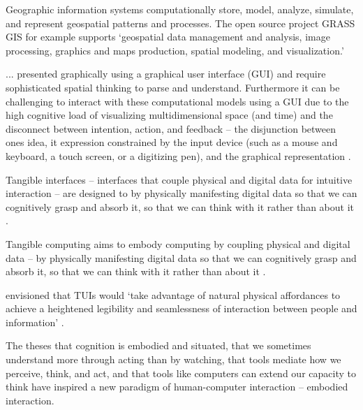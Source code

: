Geographic information systems computationally store, model, analyze, simulate, and represent geospatial patterns and processes. 
%
The open source project GRASS GIS for example supports 
`geospatial data management and analysis, image processing, graphics and maps production, spatial modeling, and visualization.'


... presented graphically using a graphical user interface (GUI) and require sophisticated spatial thinking to parse and understand. 
Furthermore it can be challenging to interact with these computational models using a GUI 
due to the high cognitive load of visualizing multidimensional space (and time) %
and the disconnect between intention, action, and feedback -- 
the disjunction between ones idea, it expression constrained by the input device (such as a mouse and keyboard, a touch screen, or a digitizing pen), and the graphical representation \cite{Dourish2001,Ishii2008}. 










Tangible interfaces -- interfaces that couple physical and digital data for intuitive interaction \citep{Dourish2001} -- 
are designed to by physically manifesting digital data so that we can cognitively grasp and absorb it,
so that we can think with it rather than about it \citep{Kirsh2013}. 


Tangible computing aims to embody computing 
by coupling physical and digital data \citep{Dourish2001} -- 
by physically manifesting digital data so that we can cognitively grasp and absorb it,
so that we can think with it rather than about it \citep{Kirsh2013}. 

\citeauthor{Ishii1997} envisioned that TUIs would  `take advantage of natural physical affordances to achieve a heightened legibility and seamlessness of interaction between people and information' \citeyearpar{Ishii1997}. 



The theses
that cognition is embodied and situated,
that we sometimes understand more through acting than by watching,
that tools mediate how we perceive, think, and act, 
and that tools like computers can extend our capacity to think \citep{Kirsh2013}
have inspired a new paradigm of human-computer interaction -- embodied interaction.  



